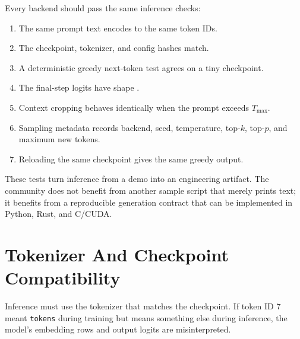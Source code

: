 Every backend should pass the same inference checks:

\begin{enumerate}
  \item The same prompt text encodes to the same token IDs.
  \item The checkpoint, tokenizer, and config hashes match.
  \item A deterministic greedy next-token test agrees on a tiny checkpoint.
  \item The final-step logits have shape \shape{[B,V]}.
  \item Context cropping behaves identically when the prompt exceeds \(T_{\max}\).
  \item Sampling metadata records backend, seed, temperature, top-\(k\), top-\(p\), and
  maximum new tokens.
  \item Reloading the same checkpoint gives the same greedy output.
\end{enumerate}

These tests turn inference from a demo into an engineering artifact. The community does
not benefit from another sample script that merely prints text; it benefits from a
reproducible generation contract that can be implemented in Python, Rust, and C/CUDA.

\section{Tokenizer And Checkpoint Compatibility}

Inference must use the tokenizer that matches the checkpoint. If token ID \(7\) meant \texttt{tokens} during training but means something else during inference, the model's embedding rows and output logits are misinterpreted.

\begin{center}
\end{center}

